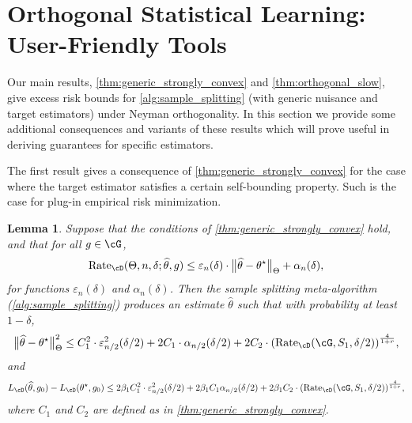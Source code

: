 \documentclass[11pt]{article} %
\newcommand{\pref}[1]{\cref{#1}}
\theoremstyle{theorem}  %
\newtheorem{lemma}{Lemma}
\theoremstyle{plain}
\DeclarePairedDelimiter{\prn}{(}{)}
\DeclarePairedDelimiter{\nrm}{\|}{\|}
\newcommand{\veps}{\varepsilon}
\newcommand{\wh}[1]{\widehat{#1}}
\newcommand{\esttwo}{\wh{\theta}}
\newcommand{\nuisance}{\cG}
\newcommand{\target}{\Theta}
\newcommand{\Rate}{\mathrm{Rate}_{\cD}}
\newcommand{\besttwo}{\theta^{\star}}
\newcommand{\gtone}{g_0}
\newcommand{\sampleone}{S_1}
\begin{document}
%
%
%
%
 
\section{Orthogonal Statistical Learning: User-Friendly Tools}
\label{sec:user_friendly}
%
Our main results, \pref{thm:generic_strongly_convex} and \pref{thm:orthogonal_slow}, give excess risk bounds for \pref{alg:sample_splitting} (with generic nuisance and target estimators) under Neyman orthogonality. In this section we provide some additional consequences and variants of these results which will prove useful in deriving guarantees for specific estimators.

The first result gives a consequence of \pref{thm:generic_strongly_convex} for the case where the target estimator satisfies a certain self-bounding property. Such is the case for plug-in empirical risk minimization.
\begin{lemma}
  \label{lem:self_bounding}
  Suppose that the conditions of \pref{thm:generic_strongly_convex} hold, and that for all $g\in\nuisance$,
  \[
    \Rate(\target, n, \delta;\esttwo,g)
    \leq{}
    \veps_n(\delta)\cdot{}\nrm[\big]{\esttwo-\besttwo}_{\target}
    + \alpha_n(\delta),
  \]
  for functions $\veps_n(\delta)$ and $\alpha_n(\delta)$. Then the sample splitting meta-algorithm (\pref{alg:sample_splitting}) produces an estimate $\esttwo$ such that with probability at least $1-\delta$,
\begin{equation}
\label{eq:self_bounding1}
\nrm[\big]{\esttwo-\besttwo}_{\target}^{2} \leq{}
C_1^2\cdot{}\veps^2_{n/2}(\delta/2) +
2C_1\cdot\alpha_{n/2}(\delta/2) + 
2C_2\cdot{}\prn*{
\Rate(\nuisance,\sampleone,\delta/2)
}^{\frac{4}{1+r}},
\end{equation}
and
\begin{equation}
\label{eq:self_bounding2}
\begin{aligned}
L_{\cD}(\esttwo,\gtone) - L_{\cD}(\besttwo, \gtone)
\leq{}
2\beta_1C_1^2\cdot{}\veps^2_{n/2}(\delta/2) + 2\beta_1C_1\alpha_{n/2}(\delta/2)+
2\beta_1C_2\cdot{}\prn*{
\Rate(\nuisance,\sampleone,\delta/2)
}^{\frac{4}{1+r}},
%
%
%
%
\end{aligned}
\end{equation}
where $C_1$ and $C_2$ are defined as in \pref{thm:generic_strongly_convex}.
\end{lemma}
\end{document}
